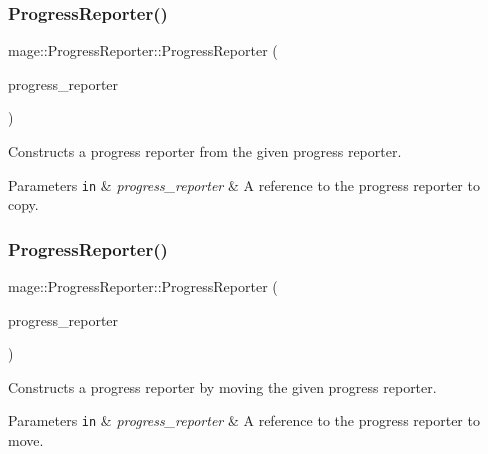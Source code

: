 \subsubsection{\texorpdfstring{Progress\+Reporter()}{ProgressReporter()}\hspace{0.1cm}{\footnotesize\ttfamily [2/3]}}
{\footnotesize\ttfamily mage\+::\+Progress\+Reporter\+::\+Progress\+Reporter (\begin{DoxyParamCaption}\item[{const \hyperlink{classmage_1_1_progress_reporter}{Progress\+Reporter} \&}]{progress\+\_\+reporter }\end{DoxyParamCaption})\hspace{0.3cm}{\ttfamily [delete]}}

Constructs a progress reporter from the given progress reporter.


\begin{DoxyParams}[1]{Parameters}
\mbox{\tt in}  & {\em progress\+\_\+reporter} & A reference to the progress reporter to copy. \\
\hline
\end{DoxyParams}
\hypertarget{classmage_1_1_progress_reporter_a5e7036f1a90e019fc75b6afca4459a78}{}\label{classmage_1_1_progress_reporter_a5e7036f1a90e019fc75b6afca4459a78} 
\subsubsection{\texorpdfstring{Progress\+Reporter()}{ProgressReporter()}\hspace{0.1cm}{\footnotesize\ttfamily [3/3]}}
{\footnotesize\ttfamily mage\+::\+Progress\+Reporter\+::\+Progress\+Reporter (\begin{DoxyParamCaption}\item[{\hyperlink{classmage_1_1_progress_reporter}{Progress\+Reporter} \&\&}]{progress\+\_\+reporter }\end{DoxyParamCaption})\hspace{0.3cm}{\ttfamily [default]}}

Constructs a progress reporter by moving the given progress reporter.


\begin{DoxyParams}[1]{Parameters}
\mbox{\tt in}  & {\em progress\+\_\+reporter} & A reference to the progress reporter to move. \\
\hline
\end{DoxyParams}
\hypertarget{classmage_1_1_progress_reporter_aa543239c6dd4474a77cf4cf6904c1b26}{}\label{classmage_1_1_progress_reporter_aa543239c6dd4474a77cf4cf6904c1b26} 
